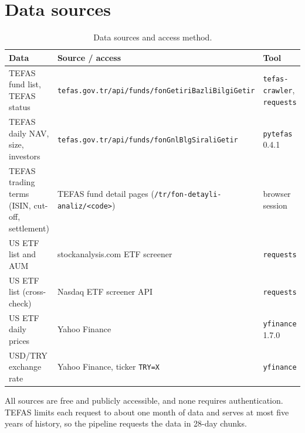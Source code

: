\documentclass[11pt,a4paper]{article}
\newcommand{\code}[1]{\texttt{\small #1}}
\begin{document}
\section{Data sources}
\begin{table}[h]
\centering\small
\caption{Data sources and access method.}
\begin{tabularx}{\linewidth}{@{}lXl@{}}
\toprule
\textbf{Data} & \textbf{Source / access} & \textbf{Tool}\\
\midrule
TEFAS fund list, TEFAS status & \code{tefas.gov.tr/api/funds/fonGetiriBazliBilgiGetir} & \code{tefas-crawler}, \code{requests}\\
TEFAS daily NAV, size, investors & \code{tefas.gov.tr/api/funds/fonGnlBlgSiraliGetir} & \code{pytefas} 0.4.1\\
TEFAS trading terms (ISIN, cut-off, settlement) & TEFAS fund detail pages (\code{/tr/fon-detayli-analiz/<code>}) & browser session\\
US ETF list and AUM & stockanalysis.com ETF screener & \code{requests}\\
US ETF list (cross-check) & Nasdaq ETF screener API & \code{requests}\\
US ETF daily prices & Yahoo Finance & \code{yfinance} 1.7.0\\
USD/TRY exchange rate & Yahoo Finance, ticker \code{TRY=X} & \code{yfinance}\\
\bottomrule
\end{tabularx}
\end{table}

All sources are free and publicly accessible, and none requires authentication. TEFAS
limits each request to about one month of data and serves at most five years of history,
so the pipeline requests the data in 28-day chunks.
\end{document}
